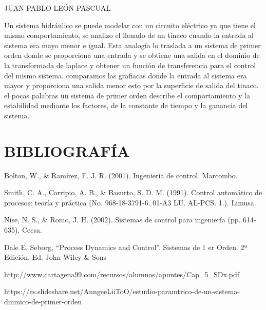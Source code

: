\documentclass{article}
\begin{document}
JUAN PABLO LEÓN PASCUAL

Un sistema hidráulico se puede modelar con un circuito eléctrico ya que tiene el mismo comportamiento, se analizo el llenado de un tinaco cuando la entrada al sistema era mayo menor e igual.
Esta analogía lo traslada a un sistema de primer orden donde se proporciona una entrada y se obtiene una salida en el dominio de la transformada de laplace y obtener un función de transferencia para el control del mismo sistema. comparamos las grafiacas donde la  entrada al sistema era mayor y proporciona una salida menor esto por la superficie de salida del tinaco. 
el pocas palabras un sistema de primer orden describe el comportamiento y la estabilidad  mediante los factores, de la constante de tiempo y la ganancia del sistema.

\section{BIBLIOGRAFÍA}
Bolton, W., & Ramírez, F. J. R. (2001). Ingeniería de control. Marcombo.

Smith, C. A., Corripio, A. B., & Basurto, S. D. M. (1991). Control automático de procesos: teoría y práctica (No. 968-18-3791-6. 01-A3 LU. AL-PCS. 1.). Limusa.

Nise, N. S., & Romo, J. H. (2002). Sistemas de control para ingeniería (pp. 614-635). Cecsa.

Dale E. Seborg, “Process Dynamics and Control”. Sistemas de 1
er 
Orden. 2ª Edición. Ed. John Wiley & Sons


http://www.cartagena99.com/recursos/alumnos/apuntes/Cap_5_SDx.pdf

https://es.slideshare.net/AnngeeLiiToO/estudio-paramtrico-de-un-sistema-dinmico-de-primer-orden
\end{document}
